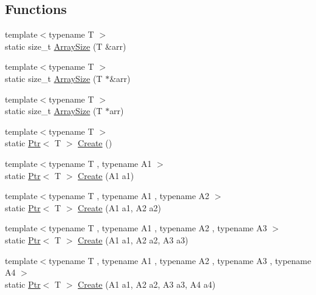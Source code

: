 \subsection*{Functions}
\begin{DoxyCompactItemize}
\item 
{\footnotesize template$<$typename T $>$ }\\static size\+\_\+t \mbox{\hyperlink{namespacepdl_1_1memory_a6b241543273dd10c22579216a915d8cd}{Array\+Size}} (T \&arr)
\item 
{\footnotesize template$<$typename T $>$ }\\static size\+\_\+t \mbox{\hyperlink{namespacepdl_1_1memory_a5d2cd992c656e757990b2b81a40a818e}{Array\+Size}} (T $\ast$\&arr)
\item 
{\footnotesize template$<$typename T $>$ }\\static size\+\_\+t \mbox{\hyperlink{namespacepdl_1_1memory_a6d676f3ba7ea07fb1dfb139a2969da2c}{Array\+Size}} (T $\ast$arr)
\item 
{\footnotesize template$<$typename T $>$ }\\static \mbox{\hyperlink{classpdl_1_1memory_1_1_ptr}{Ptr}}$<$ T $>$ \mbox{\hyperlink{namespacepdl_1_1memory_a975267fa3fa0c42eed7c349030bf1b53}{Create}} ()
\item 
{\footnotesize template$<$typename T , typename A1 $>$ }\\static \mbox{\hyperlink{classpdl_1_1memory_1_1_ptr}{Ptr}}$<$ T $>$ \mbox{\hyperlink{namespacepdl_1_1memory_a2642a2cf2f0731858c25efad5e3f8e05}{Create}} (A1 a1)
\item 
{\footnotesize template$<$typename T , typename A1 , typename A2 $>$ }\\static \mbox{\hyperlink{classpdl_1_1memory_1_1_ptr}{Ptr}}$<$ T $>$ \mbox{\hyperlink{namespacepdl_1_1memory_a4be609cc27b59d4ef61267cd3f0f86a0}{Create}} (A1 a1, A2 a2)
\item 
{\footnotesize template$<$typename T , typename A1 , typename A2 , typename A3 $>$ }\\static \mbox{\hyperlink{classpdl_1_1memory_1_1_ptr}{Ptr}}$<$ T $>$ \mbox{\hyperlink{namespacepdl_1_1memory_ab8f955922bd749f68a4e231872267d04}{Create}} (A1 a1, A2 a2, A3 a3)
\item 
{\footnotesize template$<$typename T , typename A1 , typename A2 , typename A3 , typename A4 $>$ }\\static \mbox{\hyperlink{classpdl_1_1memory_1_1_ptr}{Ptr}}$<$ T $>$ \mbox{\hyperlink{namespacepdl_1_1memory_a2db861a7467f4ab439102fa1d132a643}{Create}} (A1 a1, A2 a2, A3 a3, A4 a4)

\end{DoxyCompactItemize}

